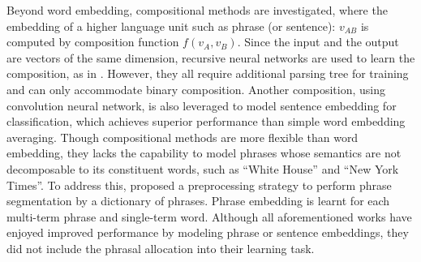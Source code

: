 Beyond word embedding, compositional methods are investigated, where the
embedding of a higher language unit such as phrase (or sentence): $v_{A B}$ is
computed by composition function $f(v_A, v_B)$. Since the input and the output
are vectors of the same dimension, recursive neural networks are used to learn the
composition, as in \cite{le2015compositional,irsoy2014deep,socher2013parsing}.
However, they all require additional parsing tree for training and can only
accommodate binary composition. Another composition, using convolution neural
network, is also leveraged to model sentence embedding for classification, which
achieves superior performance than simple word embedding averaging. Though
compositional methods are more flexible than word embedding, they lacks the
capability to model phrases whose semantics are not decomposable to its
constituent words, such as ``White House'' and ``New York Times''. To address
this, \cite{yin2014exploration} proposed a preprocessing strategy to perform
phrase segmentation by a dictionary of phrases. Phrase embedding is learnt for
each multi-term phrase and single-term word. Although all aforementioned works
have enjoyed improved performance by modeling phrase or sentence embeddings,
they did not include the phrasal allocation into their learning task.

